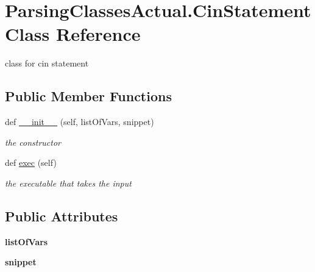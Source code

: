 \hypertarget{class_parsing_classes_actual_1_1_cin_statement}{}\section{Parsing\+Classes\+Actual.\+Cin\+Statement Class Reference}
\label{class_parsing_classes_actual_1_1_cin_statement}


class for cin statement  


\subsection*{Public Member Functions}
\begin{DoxyCompactItemize}
\item 
def \hyperlink{class_parsing_classes_actual_1_1_cin_statement_a33f554b86027e75caf334cdf023d357f}{\+\_\+\+\_\+init\+\_\+\+\_\+} (self, list\+Of\+Vars, snippet)
\begin{DoxyCompactList}\small\item\em the constructor \end{DoxyCompactList}\item 
def \hyperlink{class_parsing_classes_actual_1_1_cin_statement_a29fcb8d0a00fc0dc615ba23c0a9f6487}{exec} (self)\hypertarget{class_parsing_classes_actual_1_1_cin_statement_a29fcb8d0a00fc0dc615ba23c0a9f6487}{}\label{class_parsing_classes_actual_1_1_cin_statement_a29fcb8d0a00fc0dc615ba23c0a9f6487}

\begin{DoxyCompactList}\small\item\em the executable that takes the input \end{DoxyCompactList}\end{DoxyCompactItemize}
\subsection*{Public Attributes}
\begin{DoxyCompactItemize}
\item 
{\bfseries list\+Of\+Vars}\hypertarget{class_parsing_classes_actual_1_1_cin_statement_acaf94d5b9909e8ba0aca2b95f4a78864}{}\label{class_parsing_classes_actual_1_1_cin_statement_acaf94d5b9909e8ba0aca2b95f4a78864}

\item 
{\bfseries snippet}\hypertarget{class_parsing_classes_actual_1_1_cin_statement_ac626232d88ffca05f7976db055dacb41}{}\label{class_parsing_classes_actual_1_1_cin_statement_ac626232d88ffca05f7976db055dacb41}

\end{DoxyCompactItemize}


